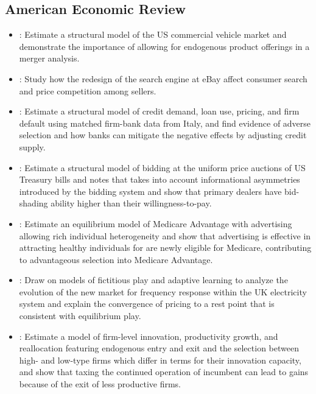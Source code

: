 \documentclass[
]{book}
\begin{document}
\hypertarget{american-economic-review}{%
\subsection{American Economic Review}\label{american-economic-review}}

\begin{itemize}
\item
  \citet{wollmannTrucksBailoutsEquilibrium2018}: Estimate a structural model of the US commercial vehicle market and demonstrate the importance of allowing for endogenous product offerings in a merger analysis.
\item
  \citet{dinersteinConsumerPriceSearch2018}: Study how the redesign of the search engine at eBay affect consumer search and price competition among sellers.
\item
  \citet{crawfordAsymmetricInformationImperfect2018}: Estimate a structural model of credit demand, loan use, pricing, and firm default using matched firm-bank data from Italy, and find evidence of adverse selection and how banks can mitigate the negative effects by adjusting credit supply.
\item
  \citet{hortacsuBidShadingBidder2018}: Estimate a structural model of bidding at the uniform price auctions of US Treasury bills and notes that takes into account informational asymmetries introduced by the bidding system and show that primary dealers have bid-shading ability higher than their willingness-to-pay.
\item
  \citet{aizawaAdvertisingRiskSelection2018}: Estimate an equilibrium model of Medicare Advantage with advertising allowing rich individual heterogeneity and show that advertising is effective in attracting healthy individuals for are newly eligible for Medicare, contributing to advantageous selection into Medicare Advantage.
\item
  \citet{doraszelskiJustStartingOut2018}: Draw on models of fictitious play and adaptive learning to analyze the evolution of the new market for frequency response within the UK electricity system and explain the convergence of pricing to a rest point that is consistent with equilibrium play.
\item
  \citet{acemogluInnovationReallocationGrowth2018}: Estimate a model of firm-level innovation, productivity growth, and reallocation featuring endogenous entry and exit and the selection between high- and low-type firms which differ in terms for their innovation capacity, and show that taxing the continued operation of incumbent can lead to gains because of the exit of less productive firms.

\end{itemize}
\end{document}
